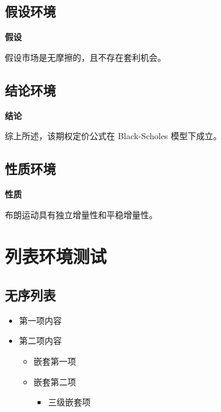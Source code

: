 \documentclass[
  11pt,
  letterpaper,
  oneside,
  a4paper]{book}
\providecommand{\tightlist}{%
  \setlength{\itemsep}{0pt}\setlength{\parskip}{0pt}}
\providecommand{\citshape}{\itshape}
\newenvironment{assumption}{\par\noindent\textbf{\color{third}假设} \citshape}{\par}
\newenvironment{conclusion}{\par\noindent\textbf{\color{third}结论} \citshape}{\par}
\newenvironment{property}{\par\noindent\textbf{\color{third}性质} \citshape}{\par}
\renewcommand{\citshape}{\kaishu}
\renewcommand{\citshape}{\itshape}
\numberwithin{equation}{chapter}
\theoremstyle{plain}
\theoremstyle{plain}
\theoremstyle{plain}
\theoremstyle{plain}
\theoremstyle{definition}
\theoremstyle{remark}
\begin{document}
\subsection{假设环境}\label{ux5047ux8bbeux73afux5883}

\begin{assumption}

假设市场是无摩擦的，且不存在套利机会。

\end{assumption}

\subsection{结论环境}\label{ux7ed3ux8bbaux73afux5883}

\begin{conclusion}

综上所述，该期权定价公式在 Black-Scholes 模型下成立。

\end{conclusion}

\subsection{性质环境}\label{ux6027ux8d28ux73afux5883}

\begin{property}

布朗运动具有独立增量性和平稳增量性。

\end{property}

\section{列表环境测试}\label{ux5217ux8868ux73afux5883ux6d4bux8bd5}

\subsection{无序列表}\label{ux65e0ux5e8fux5217ux8868}

\begin{itemize}
\tightlist
\item
  第一项内容
\item
  第二项内容

  \begin{itemize}
  \tightlist
  \item
    嵌套第一项
  \item
    嵌套第二项

    \begin{itemize}
    \tightlist
    \item
      三级嵌套项
    \end{itemize}
  \end{itemize}
\end{itemize}
\end{document}
